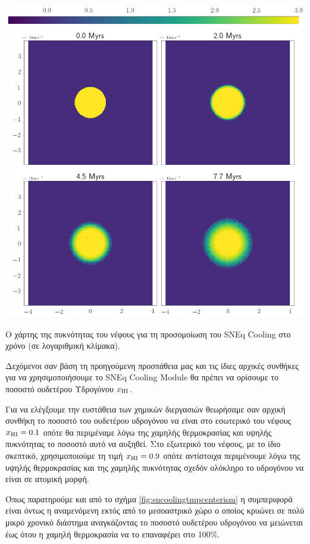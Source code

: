 			\begin{marginfigure}
				\includegraphics[width=1\linewidth]{DataImages/SNCoolingRHOquad}
				\caption{Ο χάρτης της πυκνότητας του νέφους για τη προσομοίωση του SNEq Cooling στο χρόνο (σε λογαριθμική κλίμακα).}
				\label{fig:sncoolingrhoquad}
			\end{marginfigure}
	
	Δεχόμενοι σαν βάση τη προηγούμενη προσπάθεια μας και τις ίδιες αρχικές συνθήκες για να χρησιμοποιήσουμε το SNEq Cooling Module θα πρέπει να ορίσουμε το ποσοστό ουδετέρου Υδρογόνου $x_{\ce{HI}}$.
	
	Για να ελέγξουμε την ευστάθεια των χημικών διεργασιών θεωρήσαμε σαν αρχική συνθήκη το ποσοστό του ουδετέρου υδρογόνου να είναι στο εσωτερικό του νέφους $x_{\ce{HI}}=0.1$ οπότε θα περιμέναμε λόγω της χαμηλής θερμοκρασίας και υψηλής πυκνότητας το ποσοστό αυτό να αυξηθεί. Στο εξωτερικό του νέφους, με το ίδιο σκεπτικό, χρησιμοποιούμε τη τιμή $x_{\ce{HI}}=0.9$ οπότε αντίστοιχα περιμένουμε λόγω της υψηλής θερμοκρασίας και της χαμηλής πυκνότητας σχεδόν ολόκληρο το υδρογόνου να είναι σε ατομική μορφή. 
	


	Όπως παρατηρούμε και από το σχήμα \ref{fig:sncoolingtmpcenterism} η συμπεριφορά είναι όντως η αναμενόμενη εκτός από το μεσοαστρικό χώρο ο οποίος κρυώνει σε πολύ μικρό χρονικό διάστημα αναγκάζοντας το ποσοστό ουδετέρου υδρογόνου να μειώνεται έως ότου η χαμηλή θερμοκρασία να το επαναφέρει στο 100\%. 
	
